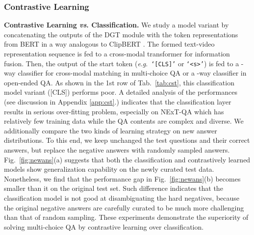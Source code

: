 \documentclass[10pt,journal,compsoc]{IEEEtran}
\newcommand{\vs}{\textit{vs}. }
\newcommand{\eg}{\textit{e}.\textit{g}.}
\begin{document}
\subsubsection{Contrastive Learning}
\label{sec:cst}
\textbf{Contrastive Learning \vs Classification.}
We study a model variant by concatenating the outputs of the DGT module with the token representations from BERT in a way analogous to ClipBERT \cite{lei2021less}. The formed text-video representation sequence is fed to a cross-modal transformer for information fusion. Then, the output of the start token (\eg~\texttt{`[CLS]'} or \texttt{`<s>'}) is fed to a -way classifier for cross-modal matching in multi-choice QA or a -way classifier in open-ended QA. As shown in the 1st row of Tab.~\ref{tab:cst}, this classification model variant ([CLS]) performs poor. A detailed analysis of the performances (see discussion in Appendix \ref{app:cst}.) indicates that the classification layer results in serious over-fitting problem, especially on NExT-QA which has relatively few training data while the QA contents are complex and diverse. We additionally compare the two kinds of learning strategy on new answer distributions. To this end, we keep unchanged the test questions and their correct answers, but replace the negative answers with randomly sampled answers. Fig.~\ref{fig:newans}(a) suggests that both the classification and contrastively learned models show generalization capability on the newly curated test data. Nonetheless, we find that the performance gap in Fig.~\ref{fig:newans}(b) becomes smaller than it on the original test set. Such difference indicates that the classification model is not good at disambiguating the hard negatives, because the original negative answers are carefully curated to be much more challenging than that of random sampling. These experiments demonstrate the superiority of solving multi-choice QA by contrastive learning over classification. 
\setlength{\tabcolsep}{2pt}
\begin{table}[t!]
    \small
    \centering
    \caption{Study of contrastive learning. RBT: RoBERTa.}
    \label{tab:cst}
    \vspace{-0.5em}
    \vspace{-0.5cm}
\end{table}
\end{document}
